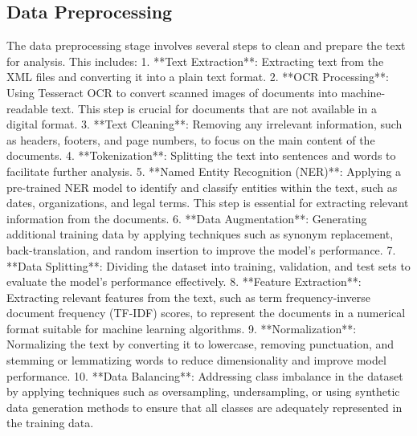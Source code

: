 \documentclass[conference]{IEEEtran}
\begin{document}
\subsection{Data Preprocessing}
The data preprocessing stage involves several steps to clean and prepare the text for analysis. This includes:
1. **Text Extraction**: Extracting text from the XML files and converting it into a plain text format.
2. **OCR Processing**: Using Tesseract OCR to convert scanned images of documents into machine-readable text. This step is crucial for documents that are not available in a digital format.
3. **Text Cleaning**: Removing any irrelevant information, such as headers, footers, and page numbers, to focus on the main content of the documents.
4. **Tokenization**: Splitting the text into sentences and words to facilitate further analysis.
5. **Named Entity Recognition (NER)**: Applying a pre-trained NER model to identify and classify entities within the text, such as dates, organizations, and legal terms. This step is essential for extracting relevant information from the documents.
6. **Data Augmentation**: Generating additional training data by applying techniques such as synonym replacement, back-translation, and random insertion to improve the model's performance.
7. **Data Splitting**: Dividing the dataset into training, validation, and test sets to evaluate the model's performance effectively.
8. **Feature Extraction**: Extracting relevant features from the text, such as term frequency-inverse document frequency (TF-IDF) scores, to represent the documents in a numerical format suitable for machine learning algorithms.
9. **Normalization**: Normalizing the text by converting it to lowercase, removing punctuation, and stemming or lemmatizing words to reduce dimensionality and improve model performance.
10. **Data Balancing**: Addressing class imbalance in the dataset by applying techniques such as oversampling, undersampling, or using synthetic data generation methods to ensure that all classes are adequately represented in the training data.
\end{document}
